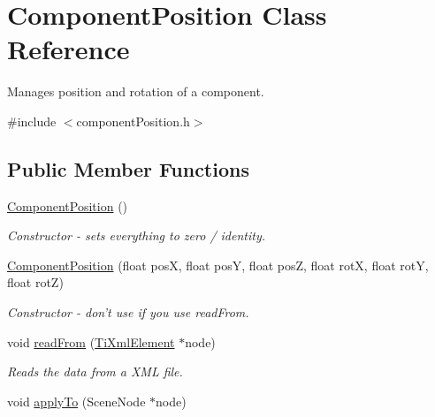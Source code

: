 \hypertarget{classComponentPosition}{
\section{\-Component\-Position \-Class \-Reference}
\label{d3/dbe/classComponentPosition}
}


\-Manages position and rotation of a component.  




{\ttfamily \#include $<$component\-Position.\-h$>$}

\subsection*{\-Public \-Member \-Functions}
\begin{DoxyCompactItemize}
\item 
\hypertarget{classComponentPosition_aac7064732595664e9d1be499d926cc5e}{
\hyperlink{classComponentPosition_aac7064732595664e9d1be499d926cc5e}{\-Component\-Position} ()}
\label{d3/dbe/classComponentPosition_aac7064732595664e9d1be499d926cc5e}

\begin{DoxyCompactList}\small\item\em \-Constructor -\/ sets everything to zero / identity. \end{DoxyCompactList}\item 
\hypertarget{classComponentPosition_a478e6773332772dee7dfb897a51ed2aa}{
\hyperlink{classComponentPosition_a478e6773332772dee7dfb897a51ed2aa}{\-Component\-Position} (float pos\-X, float pos\-Y, float pos\-Z, float rot\-X, float rot\-Y, float rot\-Z)}
\label{d3/dbe/classComponentPosition_a478e6773332772dee7dfb897a51ed2aa}

\begin{DoxyCompactList}\small\item\em \-Constructor -\/ don't use if you use read\-From. \end{DoxyCompactList}\item 
\hypertarget{classComponentPosition_a9f1ed85b3cd389a6e80c1f59e93331db}{
void \hyperlink{classComponentPosition_a9f1ed85b3cd389a6e80c1f59e93331db}{read\-From} (\hyperlink{classTiXmlElement}{\-Ti\-Xml\-Element} $\ast$node)}
\label{d3/dbe/classComponentPosition_a9f1ed85b3cd389a6e80c1f59e93331db}

\begin{DoxyCompactList}\small\item\em \-Reads the data from a \-X\-M\-L file. \end{DoxyCompactList}\item 
\hypertarget{classComponentPosition_ad275b134624b67c8bac219e70ab19b7e}{
void \hyperlink{classComponentPosition_ad275b134624b67c8bac219e70ab19b7e}{apply\-To} (\-Scene\-Node $\ast$node)}
\label{d3/dbe/classComponentPosition_ad275b134624b67c8bac219e70ab19b7e}


\end{DoxyCompactItemize}
